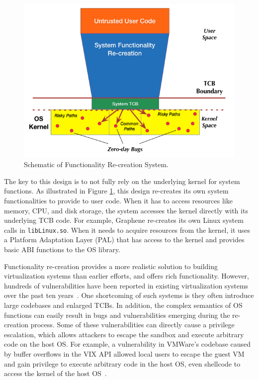 \begin{figure}%
\centering
\includegraphics[width=1.0\columnwidth]{diagram/Virtualization_Design_Model_02.png}
\caption{\small Schematic of Functionality Re-creation System.}
\label{fig:design_functionality_reimplementation}
\end{figure}

The key to this design is to not fully rely on the underlying
kernel for system functions. As illustrated in Figure \ref{fig:design_functionality_reimplementation},
this design re-creates its own system functionalities to provide to user code.
When it has to %
access resources like memory, CPU, and disk storage, the system accesses the kernel directly with
its underlying TCB code.
For example, Graphene \cite{Graphene-14} re-creates
its own Linux system calls in
\texttt{libLinux.so}. When it needs to acquire resources from
the kernel, it uses a
Platform Adaptation Layer (PAL)  that has access to the kernel
and provides basic ABI functions to the OS library.

Functionality re-creation provides a more realistic solution to building
virtualization systems than earlier efforts, and offers rich functionality.
However, hundreds of vulnerabilities have been
reported in existing virtualization systems over the past ten years~\cite{NVD}.
One shortcoming of such systems is they often
introduce large codebases and enlarged TCBs. In addition, the
complex semantics of OS functions can easily result in bugs and vulnerabilities
emerging during the re-creation process. Some of these vulnerabilities
can directly cause a privilege escalation, which allows attackers to escape the sandbox
and execute arbitrary code on the host OS.
For example, a vulnerability in VMWare's codebase caused by buffer overflows in the VIX
API allowed local users to escape the guest VM and
gain privilege to execute arbitrary code in the host
OS, even shellcode to access the kernel of the host OS~\cite{CVE-2008-2100}.


